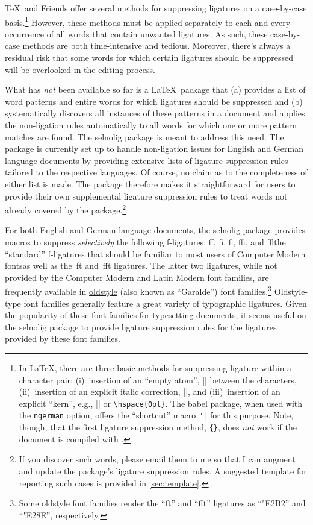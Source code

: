 \documentclass[11pt]{article}
\newcommand{\pkg}[1]{\textsf{#1}}
\newcommand{\opt}[1]{\texttt{#1}}
\begin{document}
\TeX\ and Friends offer several methods for suppressing ligatures on a case-by-case basis.\footnote{In \LaTeX, there are three basic methods for suppressing ligature within a character pair: (i)~insertion of an \enquote{empty atom}, |{}| between the characters, (ii)~insertion of an explicit italic correction, |\/|, and (iii)~insertion of an explicit \enquote{kern}, e.g., |\kern0pt| or \Verb/\hspace{0pt}/. The \pkg{babel} package, when used with the \opt{ngerman} option, offers the \enquote{shortcut} macro \Verb/"|/ for this purpose. Note, though, that the first ligature suppression method, \Verb/{}/, does \emph{not} work if the document is compiled with \LuaLaTeX.} However, these methods must be applied separately to each and every occurrence of all words that contain unwanted ligatures. As such, these case-by-case methods are both time-intensive and tedious. Moreover, there's always a residual risk that some words for which certain ligatures should be suppressed will be overlooked in the editing process. 

What has \emph{not} been available so far is a \LaTeX\ package that (a) provides a list of word patterns and entire words for which ligatures should be suppressed and (b) systematically discovers all instances of these patterns in a document and applies the non-ligation rules automatically to all words for which one or more pattern matches are found. The \pkg{selnolig} package is meant to address this need. The package is currently set up to handle non-ligation issues for English and German language documents by providing extensive lists of ligature suppression rules tailored to the respective languages. Of course, no claim as to the completeness of either list is made. The package therefore makes it straightforward for users to provide their own supplemental ligature suppression rules to treat words not already covered by the package.\footnote{If you discover such words, please email them to me so that I can augment and update the package's ligature suppression rules. A suggested template for reporting such cases is provided in \cref{sec:template}.} 

For both English and German language documents, the \pkg{selnolig} package provides macros to suppress \emph{selectively} the following f-ligatures: ff, fi, fl, ffi, and ffl\textemdash the \enquote{standard} f-ligatures that should be familiar to most users of Computer Modern fonts\textemdash as well as the~ft and~fft ligatures. The latter two ligatures, while not provided by the Computer Modern and Latin Modern font families, are frequently available in \href{http://en.wikipedia.org/wiki/Serif#Old_Style}{oldstyle} (also known as \enquote{Garalde}) font families.\footnote{Some oldstyle font families render the \enquote{ft} and \enquote{fft} ligatures as \enquote{\char"E2B2} and \enquote{\char"E28E}, respectively.} Oldstyle-type font families generally feature a great variety of typographic ligatures. Given the popularity of these font families for typesetting documents, it seems useful on the \pkg{selnolig} package to provide ligature suppression rules for the ligatures provided by these font families.
\end{document}
